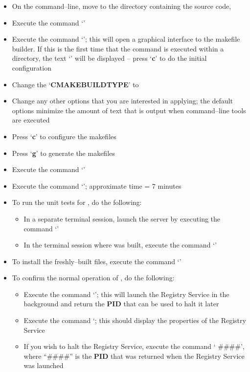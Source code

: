 \begin{itemize}
\item On the command--line, move to the directory containing the \mplusm{} source code,
\item Execute the command `'
\item Execute the command `'; this will open a graphical interface to the
makefile builder. If this is the first time that the command is executed within a
directory, the text `' will be displayed -- press `\textbf{c}' to do
the initial configuration
\item Change the `\textbf{CMAKE\fUS{}BUILD\fUS{}TYPE}' to 
\item Change any other options that you are interested in applying; the default options
minimize the amount of text that is output when \mplusm{} command--line tools are
executed
\item Press `\textbf{c}' to configure the makefiles
\item Press `\textbf{g}' to generate the makefiles
\item Execute the command `'
\item Execute the command `'; approximate time = 7 minutes
\item To run the unit tests for \mplusm{}, do the following:
\begin{itemize}
\item In a separate terminal session, launch the \yarp{} server by executing the command
`'
\item In the terminal session where \mplusm{} was built, execute the command
`'
\end{itemize}
\item To install the freshly--built \mplusm{} files, execute the command
`'
\item To confirm the normal operation of \mplusm{}, do the following:
\begin{itemize}
\item Execute the command `'; this will launch the Registry
Service in the background and return the \textbf{PID} that can be used to halt it later
\item Execute the command `; this should display the properties
of the Registry Service
\item If you wish to halt the Registry Service, execute the command `
\#\#\#\#', where ``\#\#\#\#'' is the \textbf{PID} that was returned when the Registry
Service was launched
\end{itemize}
\end{itemize}
